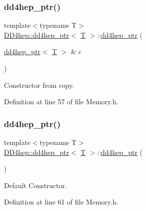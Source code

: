\subsubsection{\texorpdfstring{dd4hep\+\_\+ptr()}{dd4hep\_ptr()}\hspace{0.1cm}{\footnotesize\ttfamily [1/4]}}
{\footnotesize\ttfamily template$<$typename T$>$ \\
\hyperlink{class_d_d4hep_1_1dd4hep__ptr}{D\+D4hep\+::dd4hep\+\_\+ptr}$<$ \hyperlink{class_t}{T} $>$\+::\hyperlink{class_d_d4hep_1_1dd4hep__ptr}{dd4hep\+\_\+ptr} (\begin{DoxyParamCaption}\item[{\hyperlink{class_d_d4hep_1_1dd4hep__ptr}{dd4hep\+\_\+ptr}$<$ \hyperlink{class_t}{T} $>$ \&}]{c }\end{DoxyParamCaption})\hspace{0.3cm}{\ttfamily [inline]}}



Constructor from copy. 



Definition at line 57 of file Memory.\+h.

\hypertarget{class_d_d4hep_1_1dd4hep__ptr_a794418a47e2b889172eca52c9b42f2f9}{}\label{class_d_d4hep_1_1dd4hep__ptr_a794418a47e2b889172eca52c9b42f2f9} 
\subsubsection{\texorpdfstring{dd4hep\+\_\+ptr()}{dd4hep\_ptr()}\hspace{0.1cm}{\footnotesize\ttfamily [2/4]}}
{\footnotesize\ttfamily template$<$typename T$>$ \\
\hyperlink{class_d_d4hep_1_1dd4hep__ptr}{D\+D4hep\+::dd4hep\+\_\+ptr}$<$ \hyperlink{class_t}{T} $>$\+::\hyperlink{class_d_d4hep_1_1dd4hep__ptr}{dd4hep\+\_\+ptr} (\begin{DoxyParamCaption}{ }\end{DoxyParamCaption})\hspace{0.3cm}{\ttfamily [inline]}}



Default Constructor. 



Definition at line 61 of file Memory.\+h.

\hypertarget{class_d_d4hep_1_1dd4hep__ptr_ab9f2520963ed15270c9fbf034fbc15a9}{}\label{class_d_d4hep_1_1dd4hep__ptr_ab9f2520963ed15270c9fbf034fbc15a9} 
